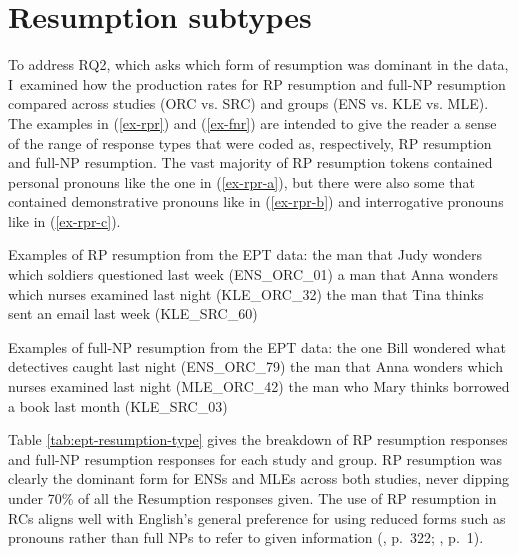 \section{Resumption subtypes}\label{ept-subtype}

To address RQ2, which asks which form of resumption was dominant in the data, I~examined how the production rates for RP resumption and full-NP resumption compared across studies (ORC vs. SRC) and groups (ENS vs. KLE vs. MLE). The examples in (\ref{ex-rpr}) and (\ref{ex-fnr}) are intended to give the reader a sense of the range of response types that were coded as, respectively, RP resumption and full-NP resumption. The vast majority of RP resumption tokens contained personal pronouns like the one in (\ref{ex-rpr-a}), but there were also some that contained demonstrative pronouns like in (\ref{ex-rpr-b}) and interrogative pronouns like in (\ref{ex-rpr-c}).

\pex\label{ex-rpr}Examples of RP resumption from the EPT data:
\a the man that Judy wonders which soldiers questioned  last week (ENS\_ORC\_01)\label{ex-rpr-a}
\a a man that Anna wonders which nurses examined  last night (KLE\_ORC\_32)\label{ex-rpr-b}
\a the man that Tina thinks  sent an email last week (KLE\_SRC\_60)\label{ex-rpr-c}
\xe

\pex\label{ex-fnr}Examples of full-NP resumption from the EPT data:
\a the one Bill wondered what detectives caught  last night (ENS\_ORC\_79)
\a the man that Anna wonders which nurses examined  last night (MLE\_ORC\_42)
\a the man who Mary thinks  borrowed a book last month
(KLE\_SRC\_03)
\xe 

Table \ref{tab:ept-resumption-type} gives the breakdown of RP resumption responses and full-NP resumption responses for each study and group. RP resumption was clearly the dominant form for ENSs and MLEs across both studies, never dipping under 70\% of all the Resumption responses given. The use of RP resumption in RCs aligns well with English's general preference for using reduced forms such as pronouns rather than full NPs to refer to given information (\cite{gordon.etal1993}, p.~322; \cite{miyao2017}, p.~1).

